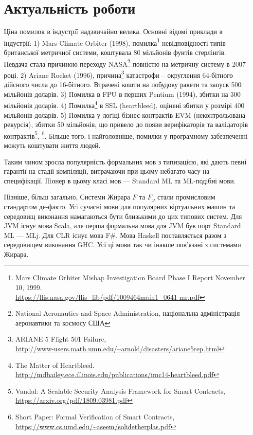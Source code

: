 \section{Актуальність роботи}
Ціна помилок в індустрії надзвичайно велика. Основні відомі приклади в індустрії:
1) Mars Climate Orbiter (1998),
   помилка\footnote{Mars Climate Orbiter Mishap Investigation Board Phase I Report November 10, 1999. \\
                    \url{https://llis.nasa.gov/llis_lib/pdf/1009464main1_0641-mr.pdf}}
   невідповідності типів британської метричної системи, коштувала 80 мільйонів фунтів стерлінгів.
   Невдача стала причиною переходу
   NASA\footnote{National Aeronautics and Space Administration, національна адміністрація аеронавтики та космосу США}
   повністю на метричну систему в 2007 році.
2) Ariane Rocket (1996),
   причина\footnote{ARIANE 5 Flight 501 Failure, \\
          \url{http://www-users.math.umn.edu/~arnold/disasters/ariane5rep.html}}
   катастрофи -- округлення 64-бітного дійсного числа до 16-бітного.
   Втрачені кошти на побудову ракети та запуск 500 мільйонів доларів.
3) Помилка в FPU в перших Pentium (1994), збитки на 300 мільйонів доларів.
4) Помилка\footnote{The Matter of Heartbleed. \\
                    \url{http://mdbailey.ece.illinois.edu/publications/imc14-heartbleed.pdf}}
   в SSL (heartbleed), оцінені збитки у розмірі 400 мільйонів доларів.
5) Помилка у логіці бізнес-контрактів EVM (неконтрольована рекурсія), збитки 50 мільйонів,
   що привело до появи верифікаторів та валідаторів
   контрактів\footnote{Vandal: A Scalable Security Analysis Framework for Smart Contracts, \\
                       \url{https://arxiv.org/pdf/1809.03981.pdf}},
             \footnote{Short Paper: Formal Verification of Smart Contracts, \\
                       \url{https://www.cs.umd.edu/~aseem/solidetherplas.pdf}}.
Більше того, і найголовніше, помилки у програмному забезпеченні можуть коштувати життя людей.

Таким чином зросла популярність формальних мов з типизацією, які дають певні гарантії
на стадії компіляції, витрачаючи при цьому небагато часу на специфікації. Піонер в цьому класі
мов --- Standard ML та ML-подібні мови.

Пізніше, більш загально, Системи Жирара $F$ та $F_\omega$ стали промисловим стандартом де-факто.
Усі сучасні мови для популярних віртуальних машин та середовищ виконання намагаються бути
близькими до цих типових систем. Для JVM існує мова Scala, але перша формальна мова для
JVM був порт Standard ML --- MLj. Для CLR існує мова F\#. Мова Haskell поставляється разом
з середовищем виконання GHC. Усі ці мови так чи інакше пов'язані з системами Жирара.

